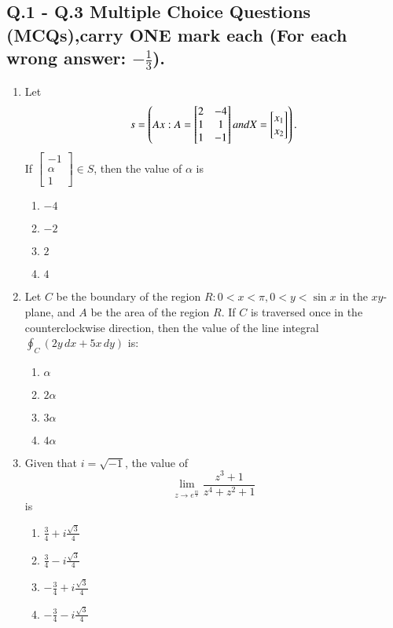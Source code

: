 \documentclass[journal,12pt,onecolumn]{IEEEtran}
\theoremstyle{remark}
\begin{document}
\subsection*{Q.1 - Q.3 Multiple Choice Questions (MCQs),carry \textbf{ONE} mark each (For each wrong answer: $-\frac{1}{3}$).
}
\begin{enumerate}
    \item Let 
    $$s = \left(A x : A = \begin{bmatrix} 2 & -4 \\ 1 & 1 \\ 1 & -1 \end{bmatrix} and X = \begin{bmatrix} x_1 \\ x_2 \end{bmatrix}\right).$$
    If $\begin{bmatrix}
        -1\\\alpha\\1
    \end{bmatrix} \in S$, then the value of $\alpha$ is
    \begin{enumerate}
        \item $-4$
        \item $-2$
        \item $2$
        \item $4$
    \end{enumerate}
    \item Let $C$ be the boundary of the region $R: 0 < x < \pi, 0 < y < \sin x$ in the $xy$-plane, and $A$ be the area of the region $R$. If $C$ is traversed once in the counterclockwise direction, then the value of the line integral $\oint_C (2y \, dx + 5x \, dy)$ is:
    \begin{enumerate}
        \item $\alpha$
        \item $2\alpha$
        \item $3\alpha$
        \item $4\alpha$
    \end{enumerate}
    \item Given that $i = \sqrt{-1}$, the value of 
    $$\lim_{z \to e^\frac{{\pi}i}{3}} \frac{z^3 + 1}{z^4+z^2 + 1}$$ is
    \begin{enumerate}
        \item $\frac{3}{4} + i \frac{\sqrt{3}}{4}$
        \item $\frac{3}{4} - i \frac{\sqrt{3}}{4}$
        \item $-\frac{3}{4} + i \frac{\sqrt{3}}{4}$
        \item $-\frac{3}{4} - i \frac{\sqrt{3}}{4}$
    \end{enumerate}
\end{enumerate}
\end{document}
